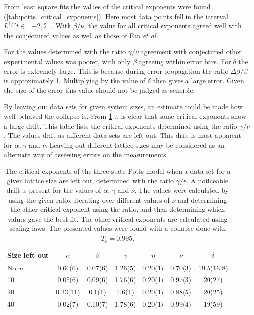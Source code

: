 \documentclass[11pt, a4paper]{report} %
\begin{document}
From least square fits the values of the critical exponents were found (\cref{tab:potts_critical_exponents}).
Here most data points fell in the interval \(L^{1/\nu}t \in [-2, 2]\).
With \(\beta/\nu\), the value for all critical exponents agreed well with the conjectured values as well as those of Fan \textit{et al.}~\cite{fan:2007}.


For the values determined with the ratio \(\gamma / \nu\) agreement with conjectured other experimental values was poorer, with only \(\beta\) agreeing within error bars.
For \(\delta\) the error is extremely large. This is because during error propagation the ratio \(\Delta \beta / \beta\) is approximately 1.
Multiplying by the value of \(\delta\) then gives a large error.
Given the size of the error this value should not be judged as sensible.

By leaving out data sets for given system sizes, an estimate could be made how well behaved the collapse is.
From \cref{tab:potts_leave_out} it is clear that some critical exponents show a large drift.
This table lists the critical exponents determined using the ratio \(\gamma/\nu\).
The values drift as different data sets are left out.
This drift is most apparent for \(\alpha\), \(\gamma\) and \(\nu\).
Leaving out different lattice sizes may be considered as an alternate way of assessing errors on the measurements.

\begin{table}[htb]
	\begin{adjustbox}{center}
		\centering
		\renewcommand{\arraystretch}{1.5}
		\begin{tabular}{l | c c c c c c}
			\hline
			Size left out& \(\alpha\) & \(\beta\) & \(\gamma\) & \(\eta\) & \(\nu\) & \(\delta\) \\\hline
			None & 0.60(6) & 0.07(6) & 1.26(5) & 0.20(1) & 0.70(3) & 19.5(16.8)\\
			10 & 0.05(6) & 0.09(6) & 1.76(6)& 0.20(1) & 0.97(3) & 20(27) \\
			20 & 0.23(11) & 0.1(1) & 1.6(1) & 0.20(1) & 0.88(5) & 20(25) \\
			40 & 0.02(7) & 0.10(7) & 1.78(6) & 0.20(1)&  0.99(4) & 19(59) \\ \hline
		\end{tabular}
	\end{adjustbox}
	\caption{The critical exponents of the three-state Potts model when a data set for a given lattice size are left out, determined with the ratio \(\gamma/\nu\).
	A noticeable drift is present for the values of \(\alpha\), \(\gamma\) and \(\nu\).
	The values were calculated by using the given ratio, iterating over different values of \(\nu\) and determining the other critical exponent using the ratio, and then determining which values gave the best fit. The other critical exponents are calculated using scaling laws. The presented values were found with a collapse done with \(T_c=0.995\).}
	\label{tab:potts_leave_out}
\end{table}
\end{document}
